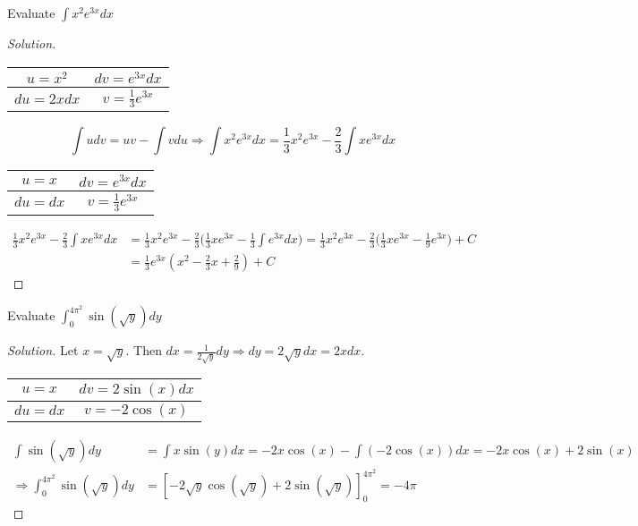 \documentclass[crop=false,class=book]{standalone}
\begin{document}
\begin{problem}
Evaluate $\int x^{2}e^{3x}dx$
\end{problem}
\begin{proof}[Solution]
\
\begin{table}[H]
    \centering
    \begin{tabular}{|c|c|}
        \hline
        $u=x^{2}$&$dv=e^{3x}dx$\\
        \hline
        $du=2xdx$&$v=\frac{1}{3}e^{3x}$\\
        \hline
    \end{tabular}
\end{table}
\begin{equation*}
    \int udv=uv-\int vdu\Rightarrow \int x^{2}e^{3x}dx=\frac{1}{3}x^{2}e^{3x}-\frac{2}{3}\int xe^{3x}dx
\end{equation*}
\begin{table}[H]
    \centering
    \begin{tabular}{|c|c|}
        \hline
        $u=x$&$dv=e^{3x}dx$\\
        \hline
        $du=dx$&$v=\frac{1}{3}e^{3x}$\\
        \hline
    \end{tabular}
\end{table}
\begin{align*}
    \frac{1}{3}x^{2}e^{3x}-\frac{2}{3}\int xe^{3x}dx&=\frac{1}{3}x^{2}e^{3x}-\frac{2}{3}\big(\frac{1}{3}xe^{3x}-\frac{1}{3}\int e^{3x}dx\big)=\frac{1}{3}x^{2}e^{3x}-\frac{2}{3}\big(\frac{1}{3}xe^{3x}-\frac{1}{9}e^{3x}\big)+C\\
    &=\frac{1}{3}e^{3x}(x^{2}-\frac{2}{3}x+\frac{2}{9})+C
\end{align*}
\end{proof}
\begin{problem}
Evaluate $\int_{0}^{4\pi^{2}}\sin(\sqrt{y})dy$
\end{problem}
\begin{proof}[Solution]
Let $x=\sqrt{y}$. Then $dx=\frac{1}{2\sqrt{y}}dy\Rightarrow dy=2\sqrt{y}dx=2xdx$.
\begin{table}[H]
    \centering
    \begin{tabular}{|c|c|}
        \hline
        $u=x$&$dv=2\sin(x)dx$\\
        \hline
        $du=dx$&$v=-2\cos(x)$\\
        \hline
    \end{tabular}
\end{table}
\begin{align*}
    \int\sin(\sqrt{y})dy&=\int x\sin(y)dx=-2x\cos(x)-\int(-2\cos(x))dx=-2x\cos(x)+2\sin(x)\\
    \Rightarrow \int_{0}^{4\pi^{2}}\sin(\sqrt{y})dy&=[-2\sqrt{y}\cos(\sqrt{y})+2\sin(\sqrt{y})]_{0}^{4\pi^{2}}=-4\pi
\end{align*}
\end{proof}
\end{document}
